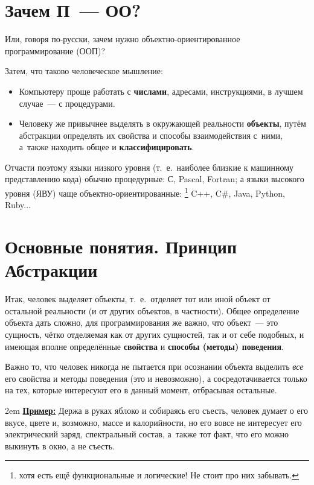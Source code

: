 \documentclass[a4paper, 14pt, titlepage]{extarticle}
\newcommand{\strong}[1]{\textbf{#1}}
\newcommand{\ie}{т.~е.~}
\newenvironment{indented}%
    { \begingroup %
        \noindent %
        \leftskip2em %
        \rightskip\leftskip }%
    { \par\endgroup }
\newenvironment{example}%
    { \begin{indented} %
        \color{dkgreen} %
        \small %
        \textbf{\underline{Пример:}} }%
    { \end{indented} }
\begin{document}
  \section{Зачем П~--- ОО?}

  Или, говоря по-русски, зачем нужно объектно-ориентированное программирование (ООП)?

  Затем, что таково человеческое мышление:
  \begin{itemize}
    \item Компьютеру проще работать с \strong{числами}, адресами, инструкциями, в лучшем случае~--- с процедурами.
    \item Человеку же привычнее выделять в окружающей реальности \strong{объекты}, путём абстракции
    определять их свойства и способы взаимодействия с~ними, а~также находить общее и
    \strong{классифицировать}.
  \end{itemize}

  Отчасти поэтому языки низкого уровня (\ie наиболее близкие к машинному представлению кода) обычно %
  процедурные: С, Pascal, Fortran; а языки высокого уровня (ЯВУ) чаще объектно-ориентированные:
  \footnote{хотя есть ещё функциональные и логические! Не стоит про них забывать.}
  C++, C\#, Java, Python, Ruby...

  \section{Основные понятия. Принцип Абстракции}\label{sec:basic_concepts}

  Итак, человек выделяет объекты, \ie отделяет тот или иной объект от остальной реальности (и от
  других объектов, в частности). Общее определение объекта дать сложно, для программирования же
  важно, что объект~--- это сущность, чётко отделяемая как от других сущностей, так и от себе
  подобных, и имеющая вполне определённые \strong{свойства} и \strong{способы (методы) поведения}.

  Важно то, что человек никогда не пытается при осознании объекта выделить \emph{все} его свойства и
  методы поведения (это и невозможно), а сосредотачивается только на тех, которые интересуют его в
  данный момент, отбрасывая остальные.

  \begin{example}
    Держа в руках яблоко и собираясь его съесть, человек думает о его вкусе, цвете и, возможно,
    массе и калорийности, но его вовсе не интересует его электрический заряд, спектральный состав,
    а~также тот факт, что его можно выкинуть в окно, а не съесть.
  \end{example}
\end{document}
